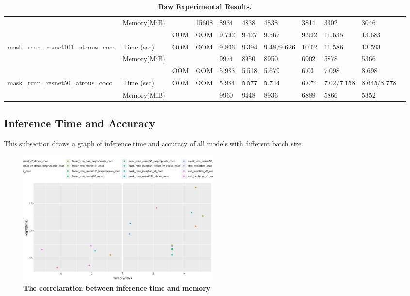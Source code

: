 \documentclass[conference]{IEEEtran}
\begin{document}
\begin{table}[]
{\begin{tabular}{lllllllllll}
                                                                & Memory(MiB)   &                     & 15608              & 8934              & 4838              & 4838             & 3814   & 3302              & 3046        &          \\
                                                                &               & OOM                 & OOM                & 9.792             & 9.427             & 9.567            & 9.932  & 11.635            & 13.683      &          \\
mask\_rcnn\_resnet101\_atrous\_coco                             & Time (sec)    & OOM                 & OOM                & 9.806             & 9.394             & 9.48/9.626       & 10.02  & 11.586            & 13.593      &          \\
                                                                & Memory(MiB)   &                     &                    & 9974              & 8950              & 8950             & 6902   & 5878              & 5366        &          \\
                                                                &               & OOM                 & OOM                & 5.983             & 5.518             & 5.679            & 6.03   & 7.098             & 8.698       &          \\
mask\_rcnn\_resnet50\_atrous\_coco                              & Time (sec)    & OOM                 & OOM                & 5.984             & 5.577             & 5.744            & 6.074  & 7.02/7.158        & 8.645/8.778 &          \\
                                                                & Memory(MiB)   &                     &                    & 9960              & 9448              & 8936             & 6888   & 5866              & 5352        &         
\end{tabular}%
}
\caption{\textbf{Raw Experimental Results.}}
\label{table:raw-results}
\end{table}

\subsection{Inference Time and Accuracy}
This subsection draws a graph of inference time and accuracy of all models with different batch size.

\begin{figure}[htpb]
	  \centering
	  \includegraphics[width=0.5\textwidth]{MemoryVSRunning}
	  \caption{\textbf{The correlaration between inference time and memory}}
	  \label{fig:memory-running}
\end{figure}
\end{document}

